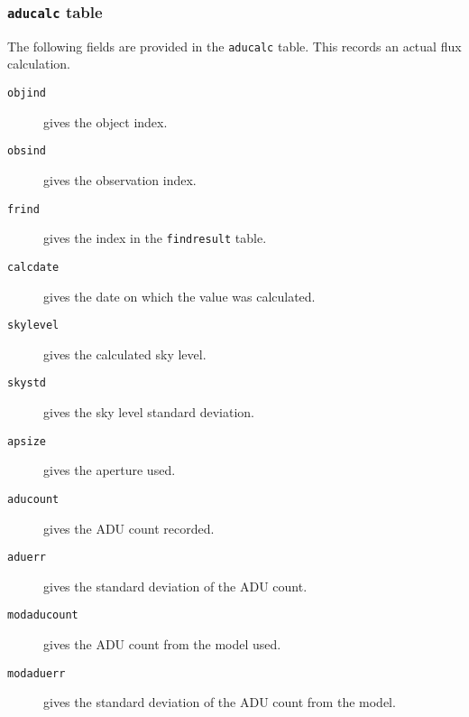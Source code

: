 \subsubsection{\texttt{aducalc} table}
\protect\label{section:aducalc}

The following fields are provided in the \texttt{aducalc} table. This records an
actual flux calculation.

\begin{description}
\item[\tt objind] gives the object index.
\item[\tt obsind] gives the observation index.
\item[\tt frind] gives the index in the \texttt{findresult} table.
\item[\tt calcdate] gives the date on which the value was calculated.
\item[\tt skylevel] gives the calculated sky level.
\item[\tt skystd] gives the sky level standard deviation.
\item[\tt apsize] gives the aperture used.
\item[\tt aducount] gives the ADU count recorded.
\item[\tt aduerr] gives the standard deviation of the ADU count.
\item[\tt modaducount] gives the ADU count from the model used.
\item[\tt modaduerr] gives the standard deviation of the ADU count from the
model.
\end{description}
